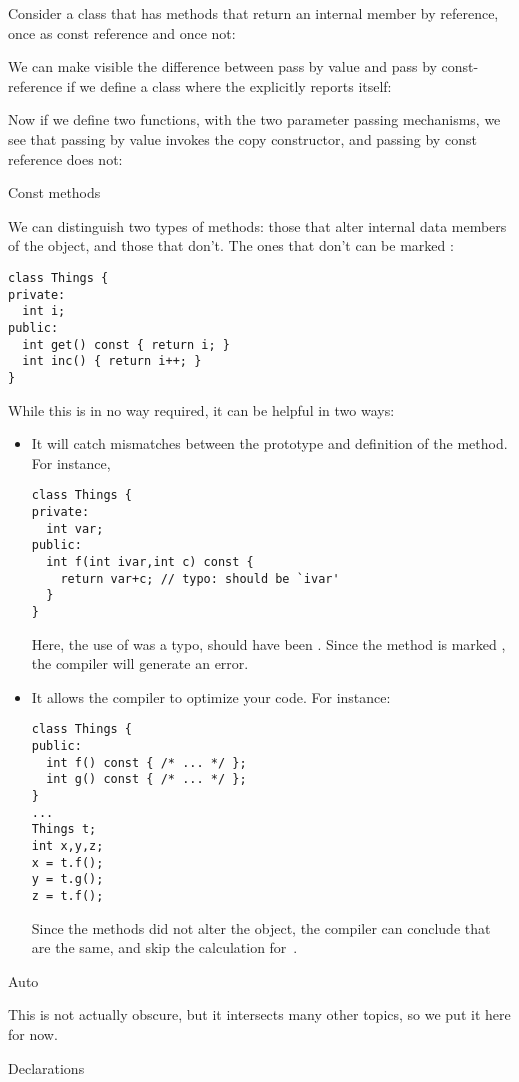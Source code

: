 Consider a class that has methods that return an internal member by
reference, once as const reference and once not:
%

We can make visible the difference between pass by value and pass by
const-reference if we define a class where the
 explicitly reports itself:
%
  
Now if we define two functions, with the two parameter passing
mechanisms, we see that passing by value invokes the copy constructor,
and passing by const reference does not:
%

 {Const methods}

We can distinguish two types of methods: those that alter internal
data members of the object, and those that don't. The ones that don't
can be marked :
\begin{verbatim}
class Things {
private:
  int i;
public:
  int get() const { return i; }
  int inc() { return i++; }
}
\end{verbatim}
While this is in no way required, it can be helpful in two ways:
\begin{itemize}
\item It will catch mismatches between the prototype and definition of
  the method. For instance,
\begin{verbatim}
class Things {
private:
  int var;
public:
  int f(int ivar,int c) const {
    return var+c; // typo: should be `ivar'
  }
}
\end{verbatim}
Here, the use of  was a typo, should have been . Since
the method is marked , the compiler will generate an error.
\item It allows the compiler to optimize your code. For instance:
\begin{verbatim}
class Things {
public:
  int f() const { /* ... */ };
  int g() const { /* ... */ };
}
...
Things t;
int x,y,z;
x = t.f();
y = t.g();
z = t.f();
\end{verbatim}
Since the methods did not alter the object, the compiler can conclude
that  are the same, and skip the calculation for~.
\end{itemize}

 {Auto}

This is not actually obscure, but it intersects many other topics, so
we put it here for now.

 {Declarations}

